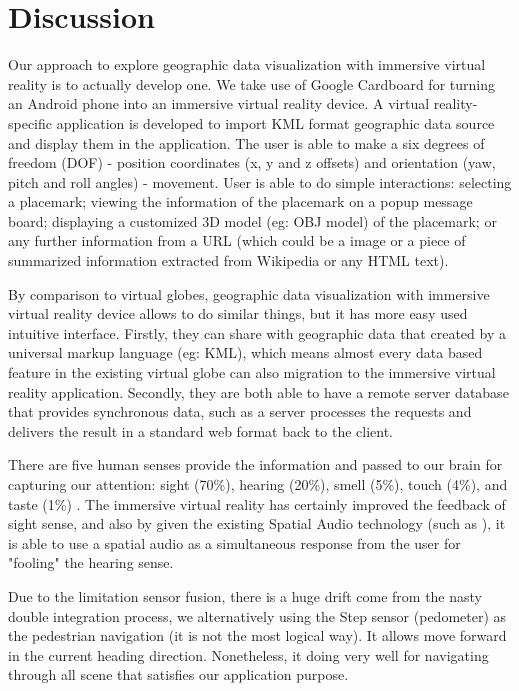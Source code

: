 \label{chapter-discussion}
\chapter{Discussion}

Our approach to explore geographic data visualization with immersive virtual reality is to actually develop one. We take use of Google Cardboard for turning an Android phone into an immersive virtual reality device. A virtual reality-specific application is developed to import KML format geographic data source and display them in the application. The user is able to make a six degrees of freedom (DOF) - position coordinates (x, y and z offsets) and orientation (yaw, pitch and roll angles) - movement. User is able to do simple interactions: selecting a placemark; viewing the information of the placemark on a popup message board; displaying a customized 3D model (eg: OBJ model) of the placemark; or any further information from a URL (which could be a image or a piece of summarized information extracted from Wikipedia or any HTML text).

By comparison to virtual globes, geographic data visualization with immersive virtual reality device allows to do similar things, but it has more easy used intuitive interface. Firstly, they can share with geographic data that created by a universal markup language (eg: KML), which means almost every data based feature in the existing virtual globe can also migration to the immersive virtual reality application. Secondly, they are both able to have a remote server database that provides synchronous data, such as a server processes the requests and delivers the result in a standard web format back to the client. 

There are five human senses provide the information and passed to our brain for capturing our attention: sight (70\%), hearing (20\%), smell (5\%), touch (4\%), and taste (1\%) \cite{mazuryk.vr.1996}. The immersive virtual reality has certainly improved the feedback of sight sense, and also by given the existing Spatial Audio technology (such as \cite{google.spatial-audio.2016}), it is able to use a spatial audio as a simultaneous response from the user for "fooling" the hearing sense.

Due to the limitation sensor fusion, there is a huge drift come from the nasty double integration process, we alternatively using the Step sensor (pedometer) as the pedestrian navigation (it is not the most logical way). It allows move forward in the current heading direction. Nonetheless, it doing very well for navigating through all scene that satisfies our application purpose.

